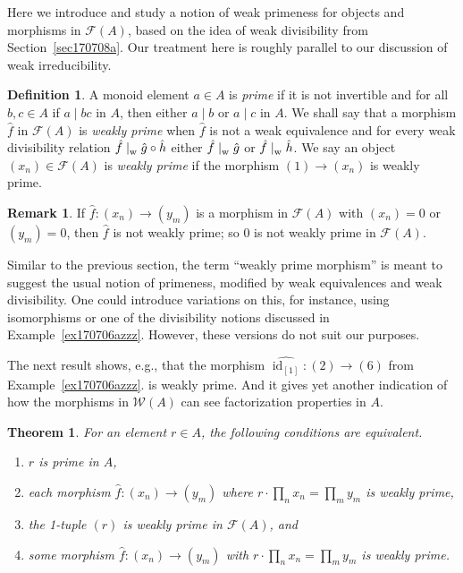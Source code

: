\documentclass[reqno]{amsart}
\theoremstyle{plain}
\newtheorem{thm}[lem]{Theorem}
\theoremstyle{definition}
\newtheorem{defn}[lem]{Definition}
\newtheorem{disc}[lem]{Remark}
\newcommand{\cat}[1]{\mathcal{#1}}
\newcommand{\catw}{\cat{W}}
\newcommand{\catf}{\cat{F}}
\newcommand{\id}{\operatorname{id}}
\newcommand{\emptytuple}{\mathfrak{0}}
\numberwithin{equation}{lem}
\newcommand{\divs}{\mid_{\text w}^{}}
\begin{document}
Here
we introduce and study a notion of 
weak primeness for objects and morphisms in $\catf(A)$, 
based on the idea of weak divisibility from Section~\ref{sec170708a}.
Our treatment here is roughly parallel to our discussion of 
weak
irreducibility.


\begin{defn}\label{defn170501ezzz}
A monoid element $a\in A$ is \emph{prime} if it is not invertible and for all $b,c\in A$ if $a\mid bc$ in $A$, then either $a\mid b$
or $a\mid c$ in $A$.
We shall say that a morphism $\hat{f}$ in $\mathcal{F}(A)$ is 
\textit{weakly
prime} when $\hat{f}$ is not a weak equivalence and for every 
weak divisibility relation 
$\hat{f} \divs \hat{g} \circ \hat{h}$ either $\hat{f} \divs \hat{g}$ or $\hat{f} \divs \hat{h}$.
We say an object $(x_n) \in \mathcal{F}(A)$ is 
\textit{weakly
prime} if  the morphism $(1) \to (x_n)$ is 
weakly prime.
\end{defn}

\begin{disc}
\label{disc170501czzz}
If $\hat f\colon(x_n)\to(y_m)$ is a morphism in $\catf(A)$ with $(x_n)=\emptytuple$ or $(y_m)=\emptytuple$,
then $\hat f$ is not 
weakly
prime; so $\emptytuple$ is not 
weakly prime
in $\catf(A)$.

Similar to the previous section, the term ``weakly prime morphism'' is meant to suggest the usual notion of primeness,
modified by weak equivalences and weak divisibility.
One could introduce variations on this,
for instance, using isomorphisms or one of the divisibility notions discussed in 
Example~\ref{ex170706azzz}.
However, these versions do not suit our purposes.
\end{disc}

The next result shows, e.g., that the morphism $\widehat{\id_{[1]}}\colon(2)\to(6)$ from
Example~\ref{ex170706azzz}.
is weakly prime.
And it gives yet another indication of how the morphisms in $\catw(A)$ can see factorization properties in $A$.

\begin{thm}\label{lem170501azzz} 
For an element $r \in A$, the following conditions are equivalent.
\begin{enumerate}[\rm(i)]
\item \label{lem170501azzz1}
$r$ is prime in $A$,
\item \label{lem170501azzz5}
each morphism $\hat f\colon (x_n)\to (y_m)$ where $r\cdot\prod_nx_n=\prod_my_m$ is weakly prime,
\item \label{lem170501azzz2} 
the 1-tuple $(r)$ is weakly prime in $\mathcal{F}(A)$, 
and
\item \label{lem170501azzz0}
some morphism $\hat f\colon (x_n)\to (y_m)$ with $r\cdot\prod_nx_n=\prod_my_m$ is weakly prime.
\end{enumerate}
\end{thm}
\end{document}
